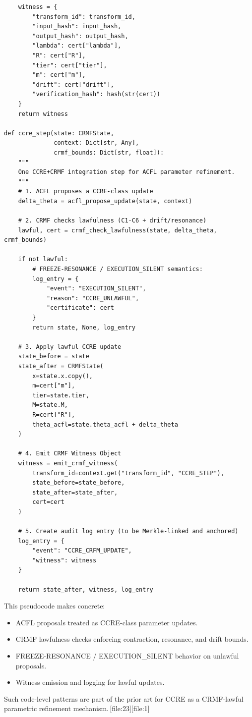 \documentclass[11pt]{article}
\begin{document}
\begin{verbatim}
    witness = {
        "transform_id": transform_id,
        "input_hash": input_hash,
        "output_hash": output_hash,
        "lambda": cert["lambda"],
        "R": cert["R"],
        "tier": cert["tier"],
        "m": cert["m"],
        "drift": cert["drift"],
        "verification_hash": hash(str(cert))
    }
    return witness

def ccre_step(state: CRMFState,
              context: Dict[str, Any],
              crmf_bounds: Dict[str, float]):
    """
    One CCRE+CRMF integration step for ACFL parameter refinement.
    """
    # 1. ACFL proposes a CCRE-class update
    delta_theta = acfl_propose_update(state, context)

    # 2. CRMF checks lawfulness (C1-C6 + drift/resonance)
    lawful, cert = crmf_check_lawfulness(state, delta_theta, crmf_bounds)

    if not lawful:
        # FREEZE-RESONANCE / EXECUTION_SILENT semantics:
        log_entry = {
            "event": "EXECUTION_SILENT",
            "reason": "CCRE_UNLAWFUL",
            "certificate": cert
        }
        return state, None, log_entry

    # 3. Apply lawful CCRE update
    state_before = state
    state_after = CRMFState(
        x=state.x.copy(),
        m=cert["m"],
        tier=state.tier,
        M=state.M,
        R=cert["R"],
        theta_acfl=state.theta_acfl + delta_theta
    )

    # 4. Emit CRMF Witness Object
    witness = emit_crmf_witness(
        transform_id=context.get("transform_id", "CCRE_STEP"),
        state_before=state_before,
        state_after=state_after,
        cert=cert
    )

    # 5. Create audit log entry (to be Merkle-linked and anchored)
    log_entry = {
        "event": "CCRE_CRFM_UPDATE",
        "witness": witness
    }

    return state_after, witness, log_entry
\end{verbatim}

This pseudocode makes concrete:
\begin{itemize}[leftmargin=1.5em]
  \item ACFL proposals treated as CCRE-class parameter updates.
  \item CRMF lawfulness checks enforcing contraction, resonance, and drift bounds.
  \item FREEZE-RESONANCE / EXECUTION\_SILENT behavior on unlawful proposals.
  \item Witness emission and logging for lawful updates.
\end{itemize}
Such code-level patterns are part of the prior art for CCRE as a CRMF-lawful parametric refinement mechanism.\,[file:23][file:1]
\end{document}
